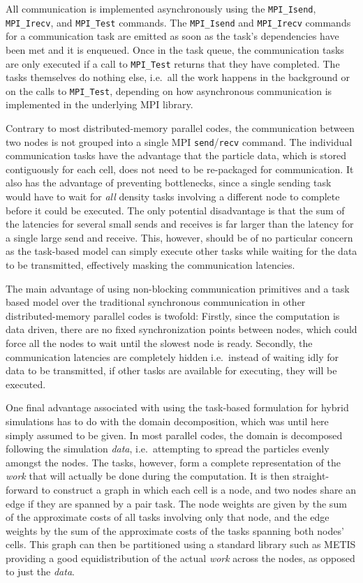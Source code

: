 \documentclass[final]{siamltex}
\begin{document}
All communication is implemented asynchronously using the
{\tt MPI\_Isend}, {\tt MPI\_Irecv}, and {\tt MPI\_Test}
commands.
The {\tt MPI\_Isend} and {\tt MPI\_Irecv} commands for a
communication task are emitted as soon as the task's dependencies
have been met and it is enqueued.
Once in the task queue, the communication tasks are only executed
if a call to {\tt MPI\_Test} returns that they have completed.
The tasks themselves do nothing else, i.e.~all the work happens
in the background or on the calls to {\tt MPI\_Test}, depending
on how asynchronous communication is implemented in the
underlying MPI library.

Contrary to most distributed-memory parallel codes, the
communication between two nodes is not grouped into a single
MPI {\tt send}/{\tt recv} command.
The individual communication tasks have the advantage that
the particle data, which is stored contiguously for each
cell, does not need to be re-packaged for communication.
It also has the advantage of preventing bottlenecks, since
a single sending task would have to wait for {\em all} density
tasks involving a different node to complete before it
could be executed.
The only potential disadvantage is that the sum of the latencies
for several small sends and receives is far larger than the
latency for a single large send and receive.
This, however, should be of no particular concern as the task-based
model can simply execute other tasks while waiting for the
data to be transmitted, effectively masking the communication latencies.

The main advantage of using non-blocking communication primitives
and a task based model over the traditional
synchronous communication in other distributed-memory parallel codes
is twofold: Firstly, since the computation is data driven,
there are no fixed synchronization points between
nodes, which could force all the nodes to wait
until the slowest node is ready.
Secondly, the communication latencies are completely hidden
i.e.~instead of waiting idly for data to be transmitted, if
other tasks are available for executing, they will be executed.

One final advantage associated with using the task-based formulation for
hybrid simulations has to do with the domain decomposition, which
was until here simply assumed to be given.
In most parallel codes, the domain is decomposed following the
simulation {\em data}, i.e.~attempting to spread the particles
evenly amongst the nodes.
The tasks, however, form a complete representation of the {\em work}
that will actually be done during the computation.
It is then straight-forward to construct a graph in which each
cell is a node, and two nodes share an edge if they are spanned
by a pair task.
The node weights are given by the sum of the approximate costs
of all tasks involving only that node, and the edge weights by the
sum of the approximate costs of the tasks spanning both nodes' cells.
This graph can then be partitioned using a standard library
such as METIS \cite{ref:Karypis1998} providing a good equidistribution
of the actual {\em work} across the nodes, as opposed to just
the {\em data}.
\end{document}
